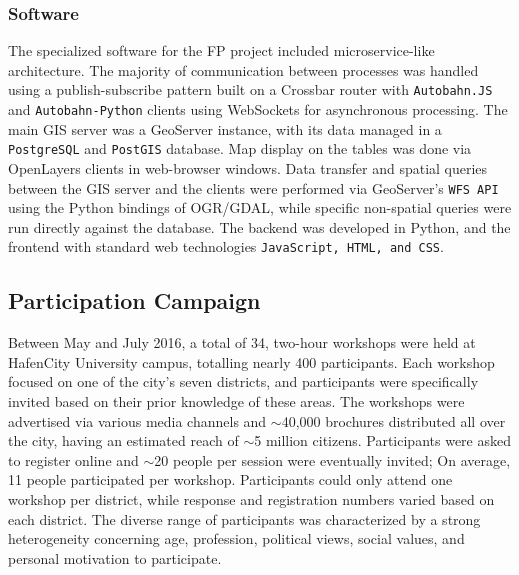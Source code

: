 {{        \subsubsection{Software}
        {
            The specialized software for the FP project included microservice-like architecture. The majority of communication between processes was handled using a publish-subscribe pattern built on a Crossbar router with \texttt{Autobahn.JS} and \texttt{Autobahn-Python} clients using WebSockets for asynchronous processing. The main GIS server was a GeoServer instance, with its data managed in a \texttt{PostgreSQL} and \texttt{PostGIS} database. Map display on the tables was done via OpenLayers clients in web-browser windows. Data transfer and spatial queries between the GIS server and the clients were performed via GeoServer's \texttt{WFS API} using the Python bindings of OGR/GDAL, while specific non-spatial queries were run directly against the database. The backend was developed in Python, and the frontend with standard web technologies \texttt{JavaScript, HTML, and CSS}.
        }

    }

    \subsection{Participation Campaign}
    {
        Between May and July 2016, a total of 34, two-hour workshops were held at HafenCity University campus, totalling nearly 400 participants. Each workshop focused on one of the city's seven districts, and participants were specifically invited based on their prior knowledge of these areas. The workshops were advertised via various media channels and $\sim$40,000 brochures distributed all over the city, having an estimated reach of $\sim$5 million citizens. Participants were asked to register online and $\sim$20 people per session were eventually invited; On average, 11 people participated per workshop. Participants could only attend one workshop per district, while response and registration numbers varied based on each district. The diverse range of participants was characterized by a strong heterogeneity concerning age, profession, political views, social values, and personal motivation to participate.


}}
